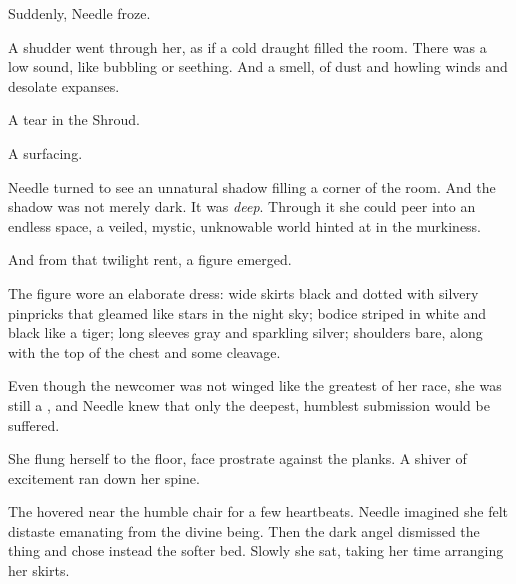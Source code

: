 % 



\begin{comment}
\section{\Achsah{} appears} 
\end{comment}

Suddenly, Needle froze. 

A shudder went through her, as if a cold draught filled the room. 
There was a low sound, like bubbling or seething. 
And a smell, of dust and howling winds and desolate expanses. 

A tear in the Shroud. 

A surfacing. 

Needle turned to see an unnatural shadow filling a corner of the room. 
And the shadow was not merely dark. 
It was \emph{deep}. 
Through it she could peer into an endless space, a veiled, mystic, unknowable world hinted at in the murkiness. 

And from that twilight rent, a figure emerged. 

The figure wore an elaborate dress: wide skirts black and dotted with silvery pinpricks that gleamed like stars in the night sky; 
bodice striped in white and black like a tiger; 
long sleeves gray and sparkling silver; 
shoulders bare, along with the top of the chest and some cleavage. 


Even though the newcomer was not winged like the greatest of her race, she was still a \resvil, and Needle knew that only the deepest, humblest submission would be suffered. 

She flung herself to the floor, face prostrate against the planks. 
A shiver of excitement ran down her spine. 

The \resvil{} hovered near the humble chair for a few heartbeats. 
Needle imagined she felt distaste emanating from the divine being. 
Then the dark angel dismissed the thing and chose instead the softer bed. 
Slowly she sat, taking her time arranging her skirts. 

